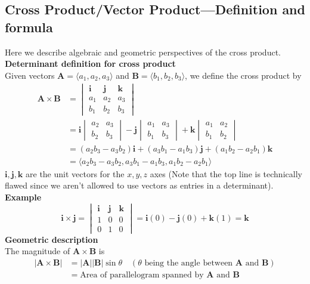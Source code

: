 \documentclass{report}
\begin{document}
\subsection{Cross Product/Vector Product---Definition and formula} %
Here we describe algebraic and geometric perspectives of the cross product.\\
\textbf{Determinant definition for cross product}\\
Given vectors $\mathbf{A}=\langle a_1,a_2,a_3\rangle$ and $\mathbf{B}=\langle b_1,b_2,b_3\rangle$,
we define the cross product by
\begin{align*}
\mathbf{A\times B}&=
\begin{vmatrix}
\mathbf{i} & \mathbf{j} & \mathbf{k}\\
a_1 & a_2 & a_3\\
b_1 & b_2 & b_3
\end{vmatrix}\\
&=\mathbf{i}
\begin{vmatrix}
a_2 & a_3\\
b_2 & b_3
\end{vmatrix}
-\mathbf{j}
\begin{vmatrix}
a_1 & a_3\\
b_1 & b_3
\end{vmatrix}
+\mathbf{k}
\begin{vmatrix}
a_1 & a_2\\
b_1 & b_2
\end{vmatrix}\\
&=(a_2b_3-a_3b_2)\mathbf{i}+(a_3b_1-a_1b_3)\mathbf{j}
+(a_1b_2-a_2b_1)\mathbf{k}\\
&=\langle a_2b_3-a_3b_2,a_3b_1-a_1b_3,a_1b_2-a_2b_1\rangle 
\end{align*}
$\mathbf{i,j,k}$ are the unit vectors for the $x,y,z$ axes (Note that the top line 
is technically flawed since we aren't allowed to use vectors as entries in a determinant).\\
\textbf{Example}
\begin{equation*}
\mathbf{i\times j}=
\begin{vmatrix}
\mathbf{i} & \mathbf{j} & \mathbf{k}\\
1 & 0 & 0\\
0 & 1 & 0
\end{vmatrix}
=\mathbf{i}(0)-\mathbf{j}(0)+\mathbf{k}(1)=\mathbf{k}
\end{equation*}
\textbf{Geometric description}\\
The magnitude of $\mathbf{A\times B}$ is
\begin{align*}
|\mathbf{A\times B}|&=|\mathbf{A}||\mathbf{B}|\sin\theta\quad
(\theta\text{ being the angle between $\mathbf{A}$ and $\mathbf{B}$})\\
&=\text{Area of parallelogram spanned by $\mathbf{A}$ and $\mathbf{B}$}
\end{align*}
\end{document}
